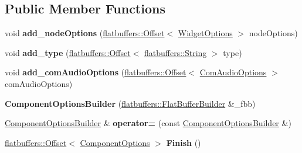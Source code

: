 \subsection*{Public Member Functions}
\begin{DoxyCompactItemize}
\item 
\mbox{\label{structflatbuffers_1_1ComponentOptionsBuilder_a2e8059941e53e4c9c0d28c02ba54d0f0}} 
void {\bfseries add\+\_\+node\+Options} (\hyperlink{structflatbuffers_1_1Offset}{flatbuffers\+::\+Offset}$<$ \hyperlink{structflatbuffers_1_1WidgetOptions}{Widget\+Options} $>$ node\+Options)
\item 
\mbox{\label{structflatbuffers_1_1ComponentOptionsBuilder_a0b7775a581535061585d039358471a8c}} 
void {\bfseries add\+\_\+type} (\hyperlink{structflatbuffers_1_1Offset}{flatbuffers\+::\+Offset}$<$ \hyperlink{structflatbuffers_1_1String}{flatbuffers\+::\+String} $>$ type)
\item 
\mbox{\label{structflatbuffers_1_1ComponentOptionsBuilder_a957a081d7859a49691e8940f033c5209}} 
void {\bfseries add\+\_\+com\+Audio\+Options} (\hyperlink{structflatbuffers_1_1Offset}{flatbuffers\+::\+Offset}$<$ \hyperlink{structflatbuffers_1_1ComAudioOptions}{Com\+Audio\+Options} $>$ com\+Audio\+Options)
\item 
\mbox{\label{structflatbuffers_1_1ComponentOptionsBuilder_a12010350731c691591508f74664eb014}} 
{\bfseries Component\+Options\+Builder} (\hyperlink{classflatbuffers_1_1FlatBufferBuilder}{flatbuffers\+::\+Flat\+Buffer\+Builder} \&\+\_\+fbb)
\item 
\mbox{\label{structflatbuffers_1_1ComponentOptionsBuilder_aa8126943dbe806febd3375bc84e43ccf}} 
\hyperlink{structflatbuffers_1_1ComponentOptionsBuilder}{Component\+Options\+Builder} \& {\bfseries operator=} (const \hyperlink{structflatbuffers_1_1ComponentOptionsBuilder}{Component\+Options\+Builder} \&)
\item 
\mbox{\label{structflatbuffers_1_1ComponentOptionsBuilder_a491a18927a63f5c207da23dc474fd79c}} 
\hyperlink{structflatbuffers_1_1Offset}{flatbuffers\+::\+Offset}$<$ \hyperlink{structflatbuffers_1_1ComponentOptions}{Component\+Options} $>$ {\bfseries Finish} ()

\end{DoxyCompactItemize}

